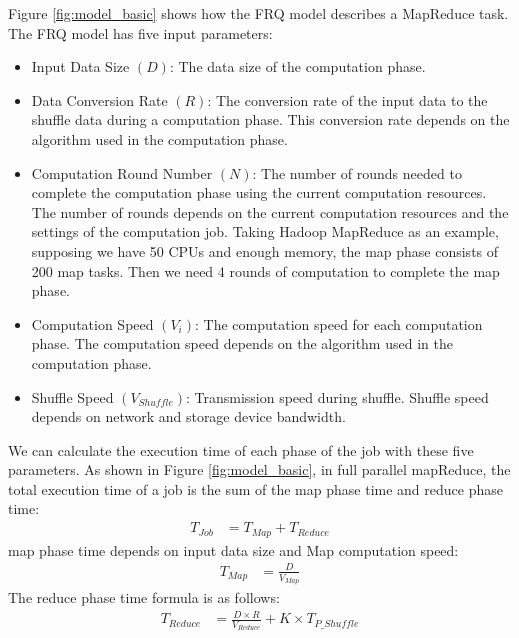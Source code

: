 {Figure \ref{fig:model_basic} shows how the FRQ model describes a MapReduce task. The FRQ model has five input parameters:
\begin{itemize}
	\item Input Data Size \((D)\): The data size of the computation phase.
	\item Data Conversion Rate \((R)\): The conversion rate of the input data to the shuffle data during a computation phase. This conversion rate depends on the algorithm used in the computation phase.
    \item Computation Round Number \((N)\): The number of rounds needed to complete the computation phase using the current computation resources. The number of rounds depends on the current computation resources and the settings of the computation job. Taking Hadoop MapReduce as an example, supposing we have 50 CPUs and enough memory, the map phase consists of 200 map tasks. Then we need 4 rounds of computation to complete the map phase.
    \item Computation Speed \((V_{i})\): 
    The computation speed for each computation phase. The computation speed depends on the algorithm used in the computation phase.
    \item Shuffle Speed \((V_{Shuffle})\): 
    Transmission speed during shuffle. Shuffle speed depends on network and storage device bandwidth.
\end{itemize}

We can calculate the execution time of each phase of the job with these five parameters. As shown in Figure \ref{fig:model_basic}, in full parallel mapReduce, the total execution time of a job is the sum of the map phase time and reduce phase time:
\begin{equation}
\label{equation_Tjob}
\begin{aligned}
    T_{Job} &= T_{Map} + T_{Reduce}
\end{aligned}
\end{equation}
map phase time depends on input data size and Map computation speed:
\begin{equation}
\label{equation_Tmap}
\begin{aligned}
    T_{Map} &= {{\frac{D}{V_{Map}}}}
\end{aligned}
\end{equation}
The reduce phase time formula is as follows:
\begin{equation}
\label{equation_Treduce}
\begin{aligned}
    T_{Reduce} &= \frac{D \times R}{V_{Reduce}} + K \times T_{P\_Shuffle}
\end{aligned}
\end{equation}

}
